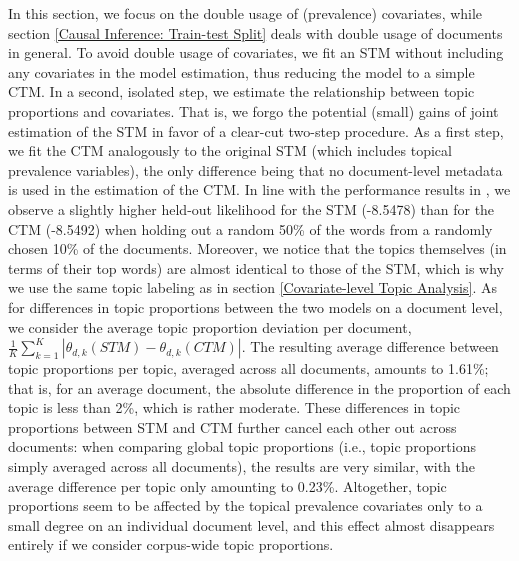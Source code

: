 In this section, we focus on the double usage of (prevalence) covariates, while section \ref{Causal Inference: Train-test Split} deals with double usage of documents in general. To avoid double usage of covariates, we fit an STM without including any covariates in the model estimation, thus reducing the model to a simple CTM. In a second, isolated step, we estimate the relationship between topic proportions and covariates. That is, we forgo the potential (small) gains of joint estimation of the STM in favor of a clear-cut two-step procedure. As a first step, we fit the CTM analogously to the original STM (which includes topical prevalence variables), the only difference being that no document-level metadata is used in the estimation of the CTM. In line with the performance results in \cite{roberts2016model}, we observe a slightly higher held-out likelihood for the STM (-8.5478) than for the CTM (-8.5492) when holding out a random 50\% of the words from a randomly chosen 10\% of the documents. Moreover, we notice that the topics themselves (in terms of their top words) are almost identical to those of the STM, which is why we use the same topic labeling as in section \ref{Covariate-level Topic Analysis}. As for differences in topic proportions between the two models on a document level, we consider the average topic proportion deviation per document, $\frac{1}{K}\sum_{k=1}^{K}|\theta_{d,k}(STM)-\theta_{d,k}(CTM)|$. The resulting average difference between topic proportions per topic, averaged across all documents, amounts to 1.61\%; that is, for an average document, the absolute difference in the proportion of each topic is less than 2\%, which is rather moderate. These differences in topic proportions between STM and CTM further cancel each other out across documents: when comparing global topic proportions (i.e., topic proportions simply averaged across all documents), the results are very similar, with the average difference per topic only
amounting to 0.23\%. Altogether, topic proportions seem to be affected by the topical prevalence covariates only to a small degree on an individual document level, and this effect almost disappears entirely if we consider corpus-wide topic proportions.

